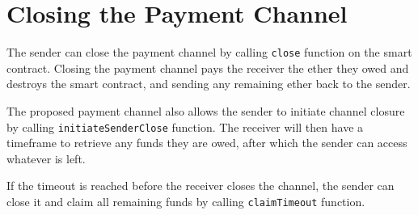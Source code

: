 \section{Closing the Payment Channel}\label{sec:closing-the-payment-channel}
The sender can close the payment channel by calling \texttt{close} function on
the smart contract.
Closing the payment channel pays the receiver the ether they owed and destroys
the smart contract, and sending any remaining ether back to the sender.



The proposed payment channel also allows the sender to initiate channel closure
by calling \texttt{initiateSenderClose} function.
The receiver will then have a timeframe to retrieve any funds they are owed,
after which the sender can access whatever is left.



If the timeout is reached before the receiver closes the channel, the sender can
close it and claim all remaining funds by calling \texttt{claimTimeout}
function.

